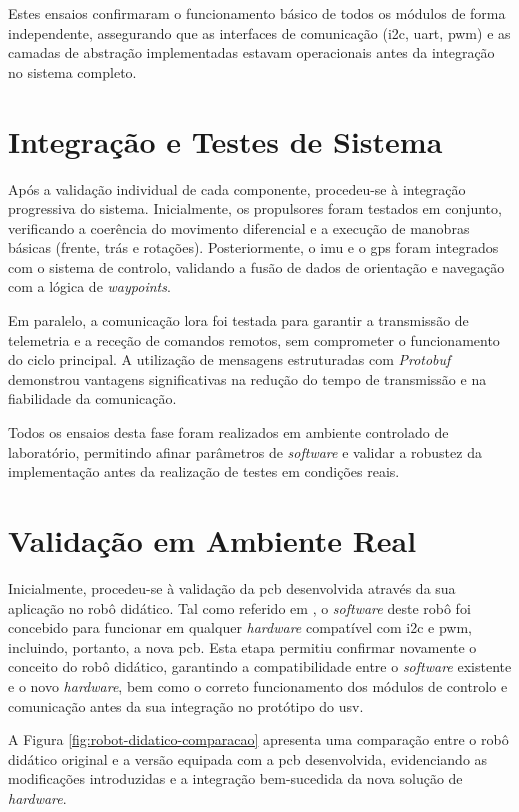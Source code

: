 Estes ensaios confirmaram o funcionamento básico de todos os módulos de forma independente, assegurando que as interfaces de comunicação (\gls{i2c}, \gls{uart}, \gls{pwm}) e as camadas de abstração implementadas estavam operacionais antes da integração no sistema completo.

\section{Integração e Testes de Sistema}

Após a validação individual de cada componente, procedeu-se à integração progressiva do sistema. Inicialmente, os propulsores foram testados em conjunto, verificando a coerência do movimento diferencial e a execução de manobras básicas (frente, trás e rotações). Posteriormente, o \gls{imu} e o \gls{gps} foram integrados com o sistema de controlo, validando a fusão de dados de orientação e navegação com a lógica de \emph{waypoints}.  

Em paralelo, a comunicação \gls{lora} foi testada para garantir a transmissão de telemetria e a receção de comandos remotos, sem comprometer o funcionamento do ciclo principal. A utilização de mensagens estruturadas com \emph{Protobuf} demonstrou vantagens significativas na redução do tempo de transmissão e na fiabilidade da comunicação.  

Todos os ensaios desta fase foram realizados em ambiente controlado de laboratório, permitindo afinar parâmetros de \emph{software} e validar a robustez da implementação antes da realização de testes em condições reais.  

\section{Validação em Ambiente Real}

Inicialmente, procedeu-se à validação da \gls{pcb} desenvolvida através da sua aplicação no robô didático. Tal como referido em \cite{didactic-robot-thesis}, o \emph{software} deste robô foi concebido para funcionar em qualquer \emph{hardware} compatível com \gls{i2c} e \gls{pwm}, incluindo, portanto, a nova \gls{pcb}. Esta etapa permitiu confirmar novamente o conceito do robô didático, garantindo a compatibilidade entre o \emph{software} existente e o novo \emph{hardware}, bem como o correto funcionamento dos módulos de controlo e comunicação antes da sua integração no protótipo do \gls{usv}.  

A Figura \ref{fig:robot-didatico-comparacao} apresenta uma comparação entre o robô didático original e a versão equipada com a \gls{pcb} desenvolvida, evidenciando as modificações introduzidas e a integração bem-sucedida da nova solução de \emph{hardware}.  


